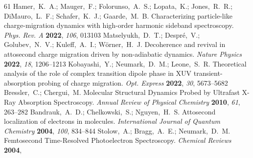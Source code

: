 \documentclass[journal=jacsat,manuscript=article]{achemso}
\begin{document}
\begin{mcitethebibliography}{61}
{\mcitedefaultendpunct}{\mcitedefaultseppunct}\relax
\EndOfBibitem
{}
Hamer,~K.~A.; Mauger,~F.; Folorunso,~A.~S.; Lopata,~K.; Jones,~R.~R.;
  DiMauro,~L.~F.; Schafer,~K.~J.; Gaarde,~M.~B. Characterizing particle-like
  charge-migration dynamics with high-order harmonic sideband spectroscopy.
  \emph{Phys. Rev. A} \textbf{2022}, \emph{106}, 013103\relax
\mciteBstWouldAddEndPuncttrue
\mciteSetBstMidEndSepPunct{\mcitedefaultmidpunct}
{\mcitedefaultendpunct}{\mcitedefaultseppunct}\relax
\EndOfBibitem
{}
Matselyukh,~D.~T.; Despr{\'e},~V.; Golubev,~N.~V.; Kuleff,~A.~I.;
  W{\"o}rner,~H.~J. Decoherence and revival in attosecond charge migration
  driven by non-adiabatic dynamics. \emph{Nature Physics} \textbf{2022},
  \emph{18}, 1206--1213\relax
\mciteBstWouldAddEndPuncttrue
\mciteSetBstMidEndSepPunct{\mcitedefaultmidpunct}
{\mcitedefaultendpunct}{\mcitedefaultseppunct}\relax
\EndOfBibitem
{}
Kobayashi,~Y.; Neumark,~D.~M.; Leone,~S.~R. Theoretical analysis of the role of
  complex transition dipole phase in XUV transient-absorption probing of charge
  migration. \emph{Opt. Express} \textbf{2022}, \emph{30}, 5673--5682\relax
\mciteBstWouldAddEndPuncttrue
\mciteSetBstMidEndSepPunct{\mcitedefaultmidpunct}
{\mcitedefaultendpunct}{\mcitedefaultseppunct}\relax
\EndOfBibitem
{}
Bressler,~C.; Chergui,~M. Molecular Structural Dynamics Probed by Ultrafast
  X-Ray Absorption Spectroscopy. \emph{Annual Review of Physical Chemistry}
  \textbf{2010}, \emph{61}, 263--282\relax
\mciteBstWouldAddEndPuncttrue
\mciteSetBstMidEndSepPunct{\mcitedefaultmidpunct}
{\mcitedefaultendpunct}{\mcitedefaultseppunct}\relax
\EndOfBibitem
{}
Bandrauk,~A.~D.; Chelkowski,~S.; Nguyen,~H.~S. Attosecond localization of
  electrons in molecules. \emph{International Journal of Quantum Chemistry}
  \textbf{2004}, \emph{100}, 834--844\relax
\mciteBstWouldAddEndPuncttrue
\mciteSetBstMidEndSepPunct{\mcitedefaultmidpunct}
{\mcitedefaultendpunct}{\mcitedefaultseppunct}\relax
\EndOfBibitem
{}
Stolow,~A.; Bragg,~A.~E.; Neumark,~D.~M. Femtosecond Time-Resolved
  Photoelectron Spectroscopy. \emph{Chemical Reviews} \textbf{2004},

\end{mcitethebibliography}
\end{document}
